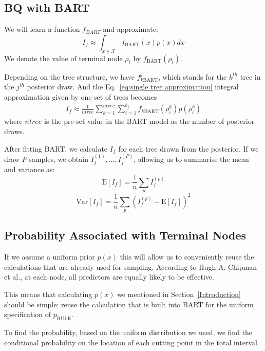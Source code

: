 
\subsection{BQ with BART}
\label{BQ with BART}
We will learn a function $f_{BART}$ and approximate:
\begin{equation}
	I_f \approx \int_{x \in \mathcal{X}} f_{\mbox{BART}}(x) p(x) dx
\label{eq:approx1}
\end{equation}
We denote the value of terminal node $\rho_i$ by $f_{\mbox{BART}}(\rho_i)$. 

Depending on the tree structure, we have $f^j_{k\mbox{BART}}$, which stands for the $k^{th}$ tree in the $j^{th}$ posterior draw. And the Eq.~\eqref{eq:single tree approximation} integral approximation given by one set of trees becomes
\begin{align}
	I_f \approx \frac{1}{ntree}\sum_{k=1}^{ntree}\sum_{i=1}^{b_j} f_{k\mbox{BART}}(\rho_i^k) p(\rho_i^k)
\end{align}
where $ntree$ is the pre-set value in the BART model as the number of posterior draws.

After fitting BART, we calculate $I_f$ for each tree drawn from the posterior.
If we draw $P$ samples, we obtain $I_f^{(1)}, \ldots, I_f^{(P)}$, allowing us to summarise
the mean and variance as:
\begin{equation}
	\mbox{E}[I_f] = \frac{1}{n} \sum_p I_f^{(p)}
\end{equation}
\begin{equation}
	\mbox{Var}[I_f] = \frac{1}{n} \sum_p (I_f^{(p)} - \mbox{E}[I_f])^2
\end{equation}

\subsection{Probability Associated with Terminal Nodes}
\label{p}

If we assume a uniform prior $p(x)$ this will allow us to conveniently reuse the calculations that are already used for sampling. According to Hugh A. Chipman et al., at each node, all predictors are equally likely to be effective.

This means that calculating $p(x)$ we mentioned in Section~\ref{Introduction} should
be simple: reuse the calculation that is built into BART for the uniform specification of $p_{\mbox{RULE}}$.

To find the probability, based on the uniform distribution we used, we find the conditional probability on the location of each cutting point in the total interval.
